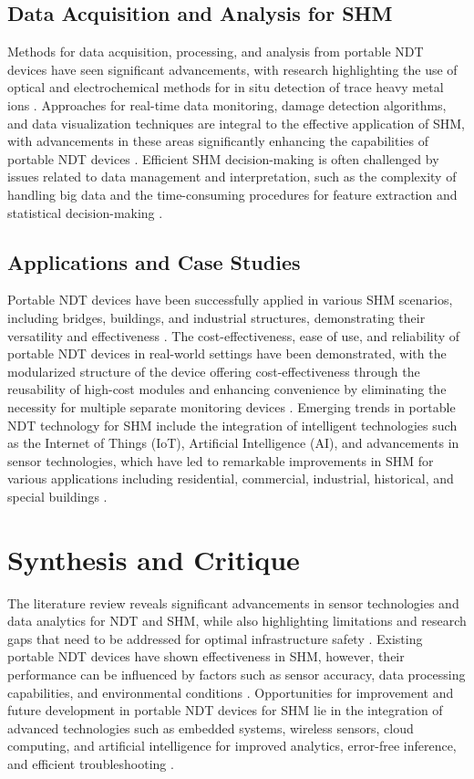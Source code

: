 \documentclass[journal, a4paper]{IEEEtran}
\begin{document}
\subsection{Data Acquisition and Analysis for SHM}
Methods for data acquisition, processing, and analysis from portable NDT
devices have seen significant advancements, with research highlighting the use of optical
and electrochemical methods for in situ detection of trace heavy metal ions \cite{Hu2023}.
Approaches for real-time data monitoring, damage detection algorithms, and data visualization techniques
are integral to the effective application of SHM, with advancements in these areas
significantly enhancing the capabilities of portable NDT devices \cite{Azimi2020} \cite{Lingxin2022}.
Efficient SHM decision-making is often challenged by issues related
to data management and interpretation, such as the complexity of handling big data and the time-consuming procedures
for feature extraction and statistical decision-making \cite{Entezami2020}.


\subsection{Applications and Case Studies}
Portable NDT devices have been successfully applied in various SHM
scenarios, including bridges, buildings, and industrial structures, demonstrating their versatility and effectiveness \cite{Parsy2018} \cite{Azimi2020}.
The cost-effectiveness, ease of use, and reliability of portable NDT
devices in real-world settings have been demonstrated, with the modularized structure of the device offering
cost-effectiveness through the reusability of high-cost modules and enhancing convenience by eliminating the
necessity for multiple separate monitoring devices \cite{Lee2023}.
Emerging trends in portable NDT technology for SHM
include the integration of intelligent technologies such as the Internet of Things (IoT), Artificial Intelligence (AI),
and advancements in sensor technologies, which have led to remarkable improvements in SHM for various applications
including residential, commercial, industrial, historical, and special buildings \cite{Vijayan2023} \cite{Hassani2023}. 


\section{Synthesis and Critique}  %
The literature review reveals significant advancements in sensor technologies and data analytics
for NDT and SHM,
while also highlighting limitations and research gaps that need to be addressed for optimal infrastructure safety \cite{Vijayan2023} \cite{Hassani2023}.
Existing portable NDT devices have shown effectiveness in SHM,
however, their performance can be influenced by factors such as sensor accuracy, data processing capabilities,
and environmental conditions \cite{Vijayan2023} \cite{Hassani2023}.
Opportunities for improvement and future development in portable NDT devices
for SHM lie in the integration of advanced technologies such as embedded systems,
wireless sensors, cloud computing, and artificial intelligence for improved analytics, error-free inference,
and efficient troubleshooting \cite{Meier2018}.
\end{document}
